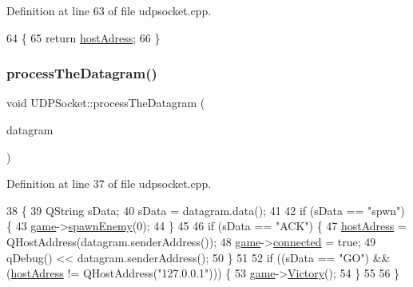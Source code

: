 Definition at line 63 of file udpsocket.\+cpp.


\begin{DoxyCode}
64 \{
65     \textcolor{keywordflow}{return} \hyperlink{class_u_d_p_socket_aacd808913633488ab008e8aa7ff8d9cf}{hostAdress};
66 \}
\end{DoxyCode}
\mbox{\label{class_u_d_p_socket_ad84c799182b7d7edafe956674ecb3faf}} 
\subsubsection{\texorpdfstring{process\+The\+Datagram()}{processTheDatagram()}}
{\footnotesize\ttfamily void U\+D\+P\+Socket\+::process\+The\+Datagram (\begin{DoxyParamCaption}\item[{Q\+Network\+Datagram}]{datagram }\end{DoxyParamCaption})}



Definition at line 37 of file udpsocket.\+cpp.


\begin{DoxyCode}
38 \{
39     QString sData;
40     sData = datagram.data();
41 
42     \textcolor{keywordflow}{if} (sData == \textcolor{stringliteral}{"spwn"}) \{
43         \hyperlink{udpsocket_8cpp_a58bdb5643d0814ac4e697a1564b79b70}{game}->\hyperlink{class_game_a2c06f08e42cb8ef918596edd11ee00d1}{spawnEnemy}(0);
44     \}
45 
46     \textcolor{keywordflow}{if} (sData == \textcolor{stringliteral}{"ACK"}) \{
47         \hyperlink{class_u_d_p_socket_aacd808913633488ab008e8aa7ff8d9cf}{hostAdress} = QHostAddress(datagram.senderAddress());
48         \hyperlink{udpsocket_8cpp_a58bdb5643d0814ac4e697a1564b79b70}{game}->\hyperlink{class_game_aec6408b42da34f430bffb649653de96b}{connected} = \textcolor{keyword}{true};        
49         qDebug() << datagram.senderAddress();
50     \}
51 
52     \textcolor{keywordflow}{if} ((sData == \textcolor{stringliteral}{"GO"}) && (\hyperlink{class_u_d_p_socket_aacd808913633488ab008e8aa7ff8d9cf}{hostAdress} != QHostAddress(\textcolor{stringliteral}{"127.0.0.1"}))) \{
53         \hyperlink{udpsocket_8cpp_a58bdb5643d0814ac4e697a1564b79b70}{game}->\hyperlink{class_game_af310eb8cf154b512e2ae488267495c96}{Victory}();
54     \}
55 
56 \}
\end{DoxyCode}
\mbox{\label{class_u_d_p_socket_a927f0446edc240955bea6e6e493e6621}} 
